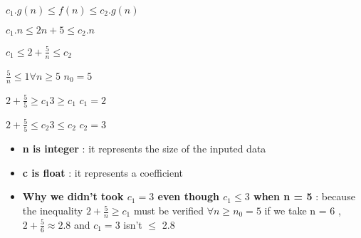 \vspace{0.5cm} 
\hspace{8.25cm}\( c_1.g(n) \leq f(n) \leq c_2.g(n)\)

\vspace{0.15cm}
\hspace{8.5cm}\( c_1.n \leq 2n+5 \leq c_2.n\)

\vspace{0.15cm}
\hspace{8.85cm}\( c_1 \leq 2 + \frac{5}{n} \leq c_2\) 

\vspace{0.15cm}
\hspace{7.75cm}\(\frac{5}{n} \leq 1\)\quad \quad \(\forall n \geq 5\) \quad \(\boxed{n_0 = 5}\)

\vspace{0.15cm}
\hspace{7.75cm}\(2 + \frac {5}{5} \geq c_1\)\quad \(3 \geq c_1\)\hspace{0.35cm} \(\boxed{c_1 = 2}\)

\vspace{0.15cm}
\hspace{7.75cm}\(2 + \frac {5}{5} \leq c_2\)\quad \(3 \leq c_2\)\hspace{0.35cm} \(\boxed{c_2 = 3}\)

\vspace{0.75cm}
\begin{tcolorbox}[enhanced, colback=white!90!greenPlot, colframe=greenPlot!60!black, coltitle=white, fonttitle=\bfseries\Large, title=Note, boxrule=1mm, arc=0.5mm, drop shadow=greenPlot!35!gray]
\begin{itemize}
    \item  \textbf{n is integer} : it represents the size of the inputed data
    \item  \textbf{c is float} : it represents a coefficient
    \item  \textbf{Why we didn't took \(c_1 = 3\) even though \(c_1 \leq 3\) when n = 5} : because the inequality \(2 + \frac {5}{n} \geq c_1\)
must be verified \(\forall n \geq n_0 = 5\) if we take n = 6 , \(2+\frac{5}{6} \approx 2.8\) and \(c_1 = 3\) isn't \(\leq\) 2.8
\end{itemize}
\end{tcolorbox}

